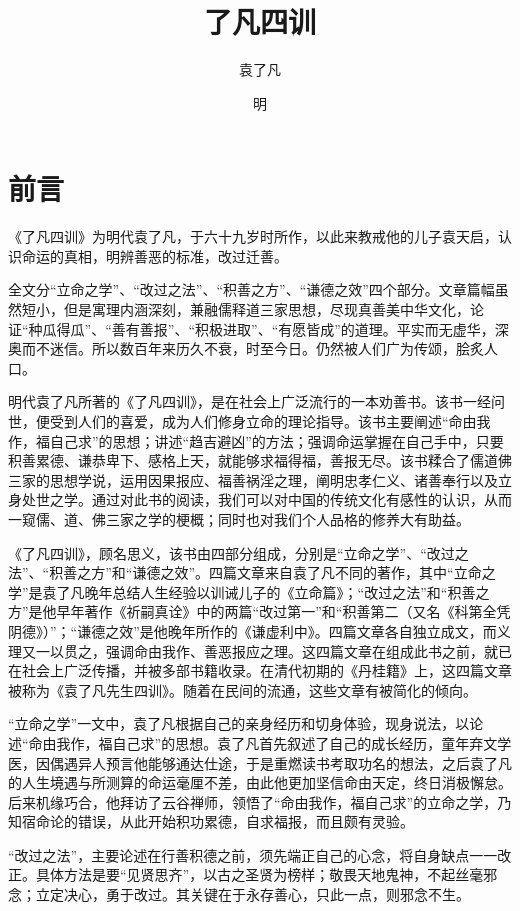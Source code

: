 \documentclass[12pt,UTF8]{ctexbook}
\title{\heiti\zihao{0} 了凡四训}
\author{袁了凡}
\date{明}
\begin{document}
\maketitle
\tableofcontents

\frontmatter

\chapter{前言}

《了凡四训》为明代袁了凡，于六十九岁时所作，以此来教戒他的儿子袁天启，认识命运的真相，明辨善恶的标准，改过迁善。

全文分“立命之学”、“改过之法”、“积善之方”、“谦德之效”四个部分。文章篇幅虽然短小，但是寓理内涵深刻，兼融儒释道三家思想，尽现真善美中华文化，论证“种瓜得瓜”、“善有善报”、“积极进取”、“有愿皆成”的道理。平实而无虚华，深奥而不迷信。所以数百年来历久不衰，时至今日。仍然被人们广为传颂，脍炙人口。

明代袁了凡所著的《了凡四训》，是在社会上广泛流行的一本劝善书。该书一经问世，便受到人们的喜爱，成为人们修身立命的理论指导。该书主要阐述“命由我作，福自己求”的思想；讲述“趋吉避凶”的方法；强调命运掌握在自己手中，只要积善累德、谦恭卑下、感格上天，就能够求福得福，善报无尽。该书糅合了儒道佛三家的思想学说，运用因果报应、福善祸淫之理，阐明忠孝仁义、诸善奉行以及立身处世之学。通过对此书的阅读，我们可以对中国的传统文化有感性的认识，从而一窥儒、道、佛三家之学的梗概；同时也对我们个人品格的修养大有助益。

《了凡四训》，顾名思义，该书由四部分组成，分别是“立命之学”、“改过之法”、“积善之方”和“谦德之效”。四篇文章来自袁了凡不同的著作，其中“立命之学”是袁了凡晚年总结人生经验以训诫儿子的《立命篇》；“改过之法”和“积善之方”是他早年著作《祈嗣真诠》中的两篇“改过第一”和“积善第二（又名《科第全凭阴德》）”；“谦德之效”是他晚年所作的《谦虚利中》。四篇文章各自独立成文，而义理又一以贯之，强调命由我作、善恶报应之理。这四篇文章在组成此书之前，就已在社会上广泛传播，并被多部书籍收录。在清代初期的《丹桂籍》上，这四篇文章被称为《袁了凡先生四训》。随着在民间的流通，这些文章有被简化的倾向。

“立命之学”一文中，袁了凡根据自己的亲身经历和切身体验，现身说法，以论述“命由我作，福自己求”的思想。袁了凡首先叙述了自己的成长经历，童年弃文学医，因偶遇异人预言他能够通达仕途，于是重燃读书考取功名的想法，之后袁了凡的人生境遇与所测算的命运毫厘不差，由此他更加坚信命由天定，终日消极懈怠。后来机缘巧合，他拜访了云谷禅师，领悟了“命由我作，福自己求”的立命之学，乃知宿命论的错误，从此开始积功累德，自求福报，而且颇有灵验。

“改过之法”，主要论述在行善积德之前，须先端正自己的心念，将自身缺点一一改正。具体方法是要“见贤思齐”，以古之圣贤为榜样；敬畏天地鬼神，不起丝毫邪念；立定决心，勇于改过。其关键在于永存善心，只此一点，则邪念不生。
\end{document}
